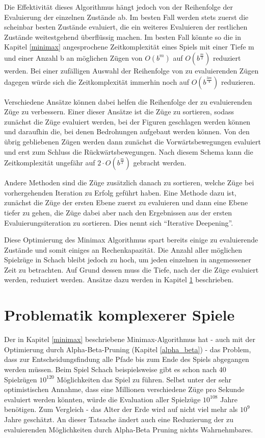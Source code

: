 Die Effektivität dieses Algorithmus hängt jedoch von der Reihenfolge der Evaluierung der einzelnen Zustände ab. Im besten Fall werden stets zuerst die scheinbar besten Zustände evaluiert, die ein weiteres Evaluieren der restlichen Zustände weitestgehend überflüssig machen. Im besten Fall könnte so die in Kapitel \ref{minimax} angesprochene Zeitkomplexität eines Spiels mit einer Tiefe m und einer Anzahl b an möglichen Zügen von $O(b^m)$ auf $O(b^\frac{m}{2})$ reduziert werden. Bei einer zufälligen Auswahl der Reihenfolge von zu evaluierenden Zügen dagegen würde sich die Zeitkomplexität immerhin noch auf $O(b^\frac{3m}{4})$ reduzieren. \cite{Russell2010}

Verschiedene Ansätze können dabei helfen die Reihenfolge der zu evaluierenden Züge zu verbessern. Einer dieser Ansätze ist die Züge zu sortieren, sodass zunächst die Züge evaluiert werden, bei der Figuren geschlagen werden können und daraufhin die, bei denen Bedrohungen aufgebaut werden können. Von den übrig gebliebenen Zügen werden dann zunächst die Vorwärtsbewegungen evaluiert und erst zum Schluss die Rückwärtsbewegungen. Nach diesem Schema kann die Zeitkomplexität ungefähr auf $2 \cdot O(b^\frac{m}{2})$ gebracht werden. \cite{Russell2010}

Andere Methoden sind die Züge zusätzlich danach zu sortieren, welche Züge bei vorhergehenden Iteration zu Erfolg geführt haben. Eine Methode dazu ist, zunächst die Züge der ersten Ebene zuerst zu evaluieren und dann eine Ebene tiefer zu gehen, die Züge dabei aber nach den Ergebnissen aus der ersten Evaluierungsiteration zu sortieren. Dies nennt sich ``Iterative Deepening''. \cite{Russell2010}

Diese Optimierung des Minimax Algorithmus spart bereits einige zu evaluierende Zustände und somit einiges an Rechenkapazität. Die Anzahl aller möglichen Spielzüge in Schach bleibt jedoch zu hoch, um jeden einzelnen in angemessener Zeit zu betrachten. Auf Grund dessen muss die Tiefe, nach der die Züge evaluiert werden, reduziert werden. Ansätze dazu werden in Kapitel \ref{depth_limit} beschrieben.

\section{Problematik komplexerer Spiele}\label{depth_limit}

Der in Kapitel \ref{minimax} beschriebene Minimax-Algorithmus hat - auch mit der Optimierung durch Alpha-Beta-Pruning (Kapitel \ref{alpha_beta}) - das Problem, dass zur Entscheidungsfindung alle Pfade bis zum Ende des Spiels abgegangen werden müssen. Beim Spiel Schach beispielsweise gibt es schon nach 40 Spielzügen $10^{120}$ Möglichkeiten das Spiel zu führen. Selbst unter der sehr optimistischen Annahme, dass eine Millionen verschiedene Züge pro Sekunde evaluiert werden könnten, würde die Evaluation aller Spielzüge $10^{108}$ Jahre benötigen. \cite{Bernstein1958} Zum Vergleich - das Alter der Erde wird auf nicht viel mehr als $10^{9}$ Jahre geschätzt. \cite{Braterman} An dieser Tatsache ändert auch eine Reduzierung der zu evaluierenden Möglichkeiten durch Alpha-Beta Pruning nichts Wahrnehmbares.

